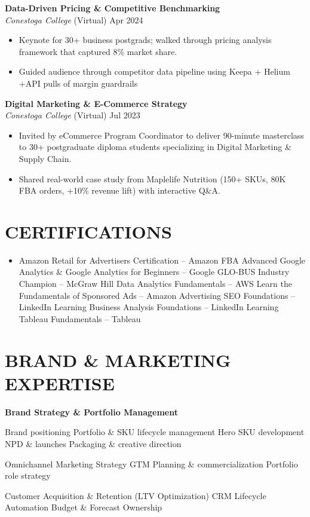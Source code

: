 \documentclass[10pt,letterpaper]{article}
\newcommand{\jobheader}[3]{\textit{#1} \hfill #2 \hfill #3}
\begin{document}
\textbf{Data-Driven Pricing \& Competitive Benchmarking}\\
\jobheader{Conestoga College}{(Virtual)}{Apr 2024}

\begin{itemize}
\item Keynote for 30+ business postgrads; walked through pricing analysis framework that captured 8\% market share.
\item Guided audience through competitor data pipeline using Keepa + Helium +API pulls of margin guardrails
\end{itemize}

\textbf{Digital Marketing \& E-Commerce Strategy}\\
\jobheader{Conestoga College}{(Virtual)}{Jul 2023}

\begin{itemize}
\item Invited by eCommerce Program Coordinator to deliver 90-minute masterclass to 30+ postgraduate diploma students specializing in Digital Marketing \& Supply Chain.
\item Shared real-world case study from Maplelife Nutrition (150+ SKUs, 80K FBA orders, +10\% revenue lift) with interactive Q\&A.
\end{itemize}

\section*{CERTIFICATIONS}

\begin{itemize}
\item Amazon Retail for Advertisers Certification – Amazon \textbar{} FBA Advanced Google Analytics \& Google Analytics for Beginners – Google \textbar{} GLO-BUS Industry Champion – McGraw Hill \textbar{} Data Analytics Fundamentals – AWS \textbar{} Learn the Fundamentals of Sponsored Ads – Amazon Advertising \textbar{} SEO Foundations – LinkedIn Learning \textbar{} Business Analysis Foundations – LinkedIn Learning \textbar{} Tableau Fundamentals – Tableau
\end{itemize}

\section*{BRAND \& MARKETING EXPERTISE}

\textbf{Brand Strategy \& Portfolio Management}

\begin{subitemize}
\item Brand positioning \textbar{} Portfolio \& SKU lifecycle management \textbar{} Hero SKU development \textbar{} NPD \& launches \textbar{} Packaging \& creative direction
\item Omnichannel Marketing Strategy \textbar{} GTM Planning \& commercialization \textbar{} Portfolio role strategy
\item Customer Acquisition \& Retention (LTV Optimization) \textbar{} CRM Lifecycle Automation \textbar{} Budget \& Forecast Ownership
\end{subitemize}
\end{document}
